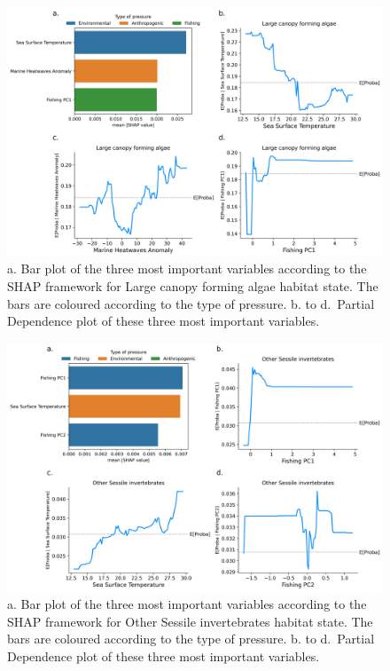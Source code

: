 \begin{figure}
\hypertarget{fig:chap3figS44}{%
\centering
\includegraphics{03-Chapitre3/figures/supplementary/04-pdp_Large canopy forming algae.png}
\caption{a. Bar plot of the three most important variables according to
the SHAP framework for Large canopy forming algae habitat state. The
bars are coloured according to the type of pressure. b. to d.~Partial
Dependence plot of these three most important
variables.}\label{fig:chap3figS44}
}
\end{figure}

\begin{figure}
\hypertarget{fig:chap3figS45}{%
\centering
\includegraphics{03-Chapitre3/figures/supplementary/04-pdp_Other Sessile invertebrates.png}
\caption{a. Bar plot of the three most important variables according to
the SHAP framework for Other Sessile invertebrates habitat state. The
bars are coloured according to the type of pressure. b. to d.~Partial
Dependence plot of these three most important
variables.}\label{fig:chap3figS45}
}
\end{figure}

